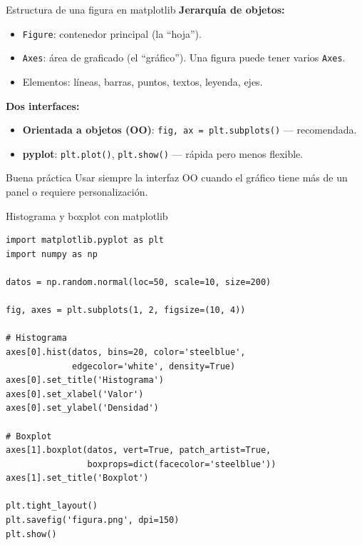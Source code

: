 \documentclass[aspectratio=169]{beamer}
\begin{document}
\begin{frame}{Estructura de una figura en matplotlib}
  \textbf{Jerarquía de objetos:}
  \begin{itemize}
    \item \texttt{Figure}: contenedor principal (la ``hoja'').
    \item \texttt{Axes}: área de graficado (el ``gráfico''). Una figura puede tener varios \texttt{Axes}.
    \item Elementos: líneas, barras, puntos, textos, leyenda, ejes.
  \end{itemize}
  \bigskip
  \textbf{Dos interfaces:}
  \begin{itemize}
    \item \textbf{Orientada a objetos (OO)}: \texttt{fig, ax = plt.subplots()} — recomendada.
    \item \textbf{pyplot}: \texttt{plt.plot()}, \texttt{plt.show()} — rápida pero menos flexible.
  \end{itemize}
  \bigskip
  \begin{alertblock}{Buena práctica}
    Usar siempre la interfaz OO cuando el gráfico tiene más de un panel o requiere personalización.
  \end{alertblock}
\end{frame}

\begin{frame}[fragile]{Histograma y boxplot con matplotlib}
\begin{lstlisting}[style=python]
import matplotlib.pyplot as plt
import numpy as np

datos = np.random.normal(loc=50, scale=10, size=200)

fig, axes = plt.subplots(1, 2, figsize=(10, 4))

# Histograma
axes[0].hist(datos, bins=20, color='steelblue',
             edgecolor='white', density=True)
axes[0].set_title('Histograma')
axes[0].set_xlabel('Valor')
axes[0].set_ylabel('Densidad')

# Boxplot
axes[1].boxplot(datos, vert=True, patch_artist=True,
                boxprops=dict(facecolor='steelblue'))
axes[1].set_title('Boxplot')

plt.tight_layout()
plt.savefig('figura.png', dpi=150)
plt.show()
\end{lstlisting}
\end{frame}
\end{document}
